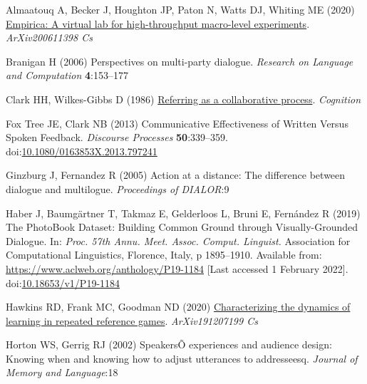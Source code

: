 \documentclass[
  english,
  a4paper,
]{article}
\newlength{\cslhangindent}
\newlength{\cslentryspacingunit} %
\newenvironment{CSLReferences}[2] %
 {%
  \setlength{\parindent}{0pt}
  \ifodd #1
  \let\oldpar\par
  \def\par{\hangindent=\cslhangindent\oldpar}
  \fi
  \setlength{\parskip}{#2\cslentryspacingunit}
 }%
 {}
\begin{document}
\hypertarget{refs}{}
\begin{CSLReferences}{1}{0}
\leavevmode{}%
Almaatouq A, Becker J, Houghton JP, Paton N, Watts DJ, Whiting ME (2020) \href{http://arxiv.org/abs/2006.11398}{Empirica: A virtual lab for high-throughput macro-level experiments}. \emph{ArXiv200611398 Cs}

\leavevmode{}%
Branigan H (2006) Perspectives on multi-party dialogue. \emph{Research on Language and Computation} \textbf{4}:153--177

\leavevmode{}%
Clark HH, Wilkes-Gibbs D (1986) \href{http://www.speech.kth.se/~edlund/bielefeld/references/clark-and-wilkes-gibbs-1986.pdf}{Referring as a collaborative process}. \emph{Cognition}

\leavevmode{}%
Fox Tree JE, Clark NB (2013) Communicative {Effectiveness} of {Written Versus Spoken Feedback}. \emph{Discourse Processes} \textbf{50}:339--359. doi:\href{https://doi.org/10.1080/0163853X.2013.797241}{10.1080/0163853X.2013.797241}

\leavevmode{}%
Ginzburg J, Fernandez R (2005) Action at a distance: The difference between dialogue and multilogue. \emph{Proceedings of DIALOR}:9

\leavevmode{}%
Haber J, Baumgärtner T, Takmaz E, Gelderloos L, Bruni E, Fernández R (2019) The {PhotoBook Dataset}: {Building Common Ground} through {Visually-Grounded Dialogue}. In: \emph{Proc. 57th {Annu}. {Meet}. {Assoc}. {Comput}. {Linguist}.} {Association for Computational Linguistics}, {Florence, Italy}, p 1895--1910. Available from: \url{https://www.aclweb.org/anthology/P19-1184} {[}Last accessed 1 February 2022{]}. doi:\href{https://doi.org/10.18653/v1/P19-1184}{10.18653/v1/P19-1184}

\leavevmode{}%
Hawkins RD, Frank MC, Goodman ND (2020) \href{http://arxiv.org/abs/1912.07199}{Characterizing the dynamics of learning in repeated reference games}. \emph{ArXiv191207199 Cs}

\leavevmode{}%
Horton WS, Gerrig RJ (2002) {SpeakersÕ} experiences and audience design: Knowing when and knowing how to adjust utterances to addresseesq. \emph{Journal of Memory and Language}:18


\end{CSLReferences}
\end{document}
